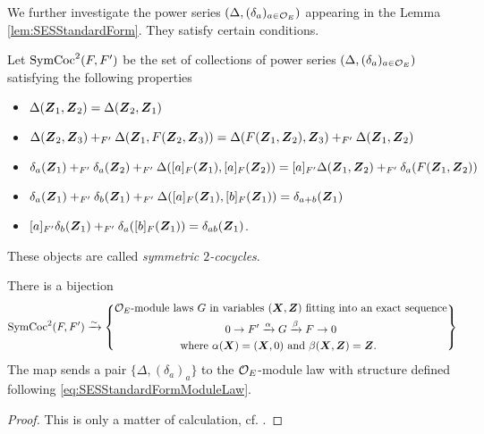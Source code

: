 \documentclass[../main.tex]{subfiles}
\begin{document}
We further investigate the power series $(\Delta, (\delta_a)_{a\in \mathcal{O}_E})$
appearing in the Lemma \ref{lem:SESStandardForm}. They satisfy certain conditions.
\begin{defi}\label{def:SymCoc2}
  Let $\operatorname{SymCoc}^2(F, F')$ be the set of collections of power series $(\Delta,
  (\delta_a)_{a \in \mathcal{O}_E})$ satisfying the following properties
  \begin{itemize}
    \item $\Delta(\boldsymbol{Z}_1,\boldsymbol{Z}_2) = \Delta(\boldsymbol{Z}_2,\boldsymbol{Z}_1)$
    \item $\Delta(\boldsymbol{Z}_2,\boldsymbol{Z}_3) +_{F'} \Delta(\boldsymbol{Z}_1, F(\boldsymbol{Z}_2,\boldsymbol{Z}_3)) =
      \Delta(F(\boldsymbol{Z}_1,\boldsymbol{Z}_2), \boldsymbol{Z}_3) +_{F'} \Delta(\boldsymbol{Z}_1,\boldsymbol{Z}_2)$
    \item $\delta_a(\boldsymbol{Z}_1) +_{F'} \delta_a(\boldsymbol{Z}_2) +_{F'} \Delta([a]_F(\boldsymbol{Z}_1),
      [a]_F(\boldsymbol{Z}_2)) = 
      [a]_{F'}\Delta(\boldsymbol{Z}_1,\boldsymbol{Z}_2) +_{F'} \delta_a(F(\boldsymbol{Z}_1,\boldsymbol{Z}_2))$
    \item $\delta_a(\boldsymbol{Z}_1) +_{F'} \delta_b(\boldsymbol{Z}_1) +_{F'} \Delta([a]_F(\boldsymbol{Z}_1),
      [b]_F(\boldsymbol{Z}_1)) =
      \delta_{a+b}(\boldsymbol{Z}_1)$
    \item $[a]_{F'}\delta_b(\boldsymbol{Z}_1) +_{F'} \delta_a([b]_F(\boldsymbol{Z}_1)) = \delta_{ab}(\boldsymbol{Z}_1)$.
  \end{itemize}
  These objects are called \emph{symmetric $2$-cocycles}. 
\end{defi}
\begin{prop}\label{prop:ClassOfFGLitoSymCoc}
  There is a bijection 
  \begin{equation*}
    \operatorname{SymCoc}^2(F, F') \xrightarrow{\sim} \left\{
      \begin{gathered}
        \text{$\mathcal{O}_E$-module laws $G$ in variables $(\boldsymbol{X},\boldsymbol{Z})$ fitting into an
        exact sequence}
        \\ 0 \to F' \xrightarrow{\alpha} G \xrightarrow{\beta} F \to 0 \\
        \text{where $\alpha(\boldsymbol{X}) = (\boldsymbol{X}, 0)$ and $\beta(\boldsymbol{X}, \boldsymbol{Z}) = \boldsymbol{Z}$. }
      \end{gathered}
      \right\}
  \end{equation*}
  The map sends a pair $\{\Delta, (\delta_a)_a\}$ to the $\mathcal{O}_E$-module law with
  structure defined following \eqref{eq:SESStandardFormModuleLaw}. 
  \begin{proof}[Proof]
    This is only a matter of calculation, cf. \cite[Section 6]{hopkins1994equivariant}.
  \end{proof}
\end{prop}
\end{document}
